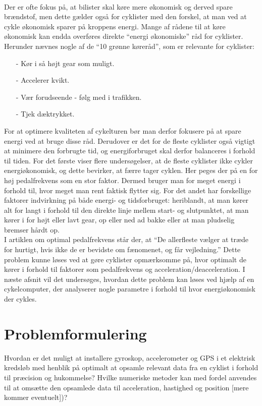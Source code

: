 \\
Der er ofte fokus på,  at bilister skal køre mere økonomisk og derved spare brændstof, men dette gælder også for cyklister med den forskel, at man ved at cykle økonomisk sparer på kroppens energi. Mange af rådene til at køre økonomisk kan endda overføres direkte “energi økonomiske” råd for cyklister. Herunder nævnes nogle af de “10 grønne køreråd”, som er relevante for cyklister:\\
\begin{itemize}
\item[-] Kør i så højt gear som muligt.
\item[-] Accelerer kvikt.
\item[-] Vær forudseende - følg med i trafikken.
\item[-] Tjek dæktrykket.
\end{itemize}
For at optimere kvaliteten af cykelturen bør man derfor fokusere på at spare energi ved at bruge disse råd. Derudover er det for de fleste cyklister også vigtigt at minimere den forbrugte tid, og energiforbruget skal derfor balanceres i forhold til tiden. For det første viser flere undersøgelser, at de fleste cyklister ikke cykler energiøkonomisk, og dette bevirker, at færre tager cyklen. Her peges der på en for høj pedalfrekvens som en stor faktor. Dermed bruger man for meget energi i forhold til, hvor meget man rent faktisk flytter sig. For det andet har forskellige faktorer indvirkning på både energi- og tidsforbruget: heriblandt, at man kører alt for langt i forhold til den direkte linje mellem start- og slutpunktet, at man kører i for højt eller lavt gear, op eller ned ad bakke eller at man pludselig bremser hårdt op.\\
I artiklen om optimal pedalfrekvens står der, at “De allerfleste vælger at træde for hurtigt, hvis ikke de er bevidste om fænomenet, og får vejledning.” Dette problem kunne løses ved at gøre cyklister opmærksomme på, hvor optimalt de kører i forhold til faktorer som pedalfrekvens og acceleration/deacceleration. I næste afsnit vil det undersøges, hvordan dette problem kan løses ved hjælp af en cykelcomputer, der analyserer nogle parametre i forhold til hvor energiøkonomisk der cykles. 

\newpage
\section{Problemformulering}
Hvordan er det muligt at installere gyroskop, accelerometer og GPS i et elektrisk kredsløb med henblik på optimalt at opsamle relevant data fra en cyklist i forhold til præcision og hukommelse? Hvilke numeriske metoder kan med fordel anvendes til at omsætte den opsamlede data til acceleration, hastighed og position [mere kommer eventuelt])?

